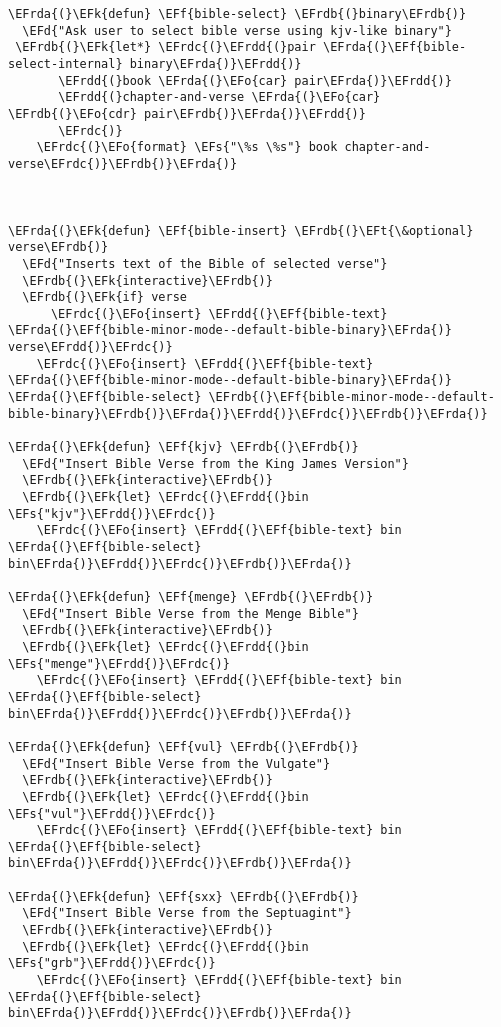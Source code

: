 \documentclass[a4wide,10pt]{article}
\newcommand{\EFs}[1]{\textcolor{EFs}{#1}} %
\newcommand{\EFd}[1]{\textcolor{EFd}{#1}} %
\newcommand{\EFk}[1]{\textcolor{EFk}{#1}} %
\newcommand{\EFf}[1]{\textcolor{EFf}{#1}} %
\newcommand{\EFt}[1]{\textcolor{EFt}{#1}} %
\newcommand{\EFo}[1]{\textcolor{EFo}{#1}} %
\newcommand{\EFrda}[1]{\textcolor{EFrda}{#1}} %
\newcommand{\EFrdb}[1]{\textcolor{EFrdb}{#1}} %
\newcommand{\EFrdc}[1]{\textcolor{EFrdc}{#1}} %
\newcommand{\EFrdd}[1]{\textcolor{EFrdd}{#1}} %
\begin{document}
\begin{Code}
\begin{Verbatim}
\EFrda{(}\EFk{defun} \EFf{bible-select} \EFrdb{(}binary\EFrdb{)}
  \EFd{"Ask user to select bible verse using kjv-like binary"}
 \EFrdb{(}\EFk{let*} \EFrdc{(}\EFrdd{(}pair \EFrda{(}\EFf{bible-select-internal} binary\EFrda{)}\EFrdd{)}
       \EFrdd{(}book \EFrda{(}\EFo{car} pair\EFrda{)}\EFrdd{)}
       \EFrdd{(}chapter-and-verse \EFrda{(}\EFo{car} \EFrdb{(}\EFo{cdr} pair\EFrdb{)}\EFrda{)}\EFrdd{)}
       \EFrdc{)}
    \EFrdc{(}\EFo{format} \EFs{"\%s \%s"} book chapter-and-verse\EFrdc{)}\EFrdb{)}\EFrda{)}



\EFrda{(}\EFk{defun} \EFf{bible-insert} \EFrdb{(}\EFt{\&optional} verse\EFrdb{)}
  \EFd{"Inserts text of the Bible of selected verse"}
  \EFrdb{(}\EFk{interactive}\EFrdb{)}
  \EFrdb{(}\EFk{if} verse
      \EFrdc{(}\EFo{insert} \EFrdd{(}\EFf{bible-text} \EFrda{(}\EFf{bible-minor-mode--default-bible-binary}\EFrda{)} verse\EFrdd{)}\EFrdc{)}
    \EFrdc{(}\EFo{insert} \EFrdd{(}\EFf{bible-text} \EFrda{(}\EFf{bible-minor-mode--default-bible-binary}\EFrda{)} \EFrda{(}\EFf{bible-select} \EFrdb{(}\EFf{bible-minor-mode--default-bible-binary}\EFrdb{)}\EFrda{)}\EFrdd{)}\EFrdc{)}\EFrdb{)}\EFrda{)}

\EFrda{(}\EFk{defun} \EFf{kjv} \EFrdb{(}\EFrdb{)}
  \EFd{"Insert Bible Verse from the King James Version"}
  \EFrdb{(}\EFk{interactive}\EFrdb{)}
  \EFrdb{(}\EFk{let} \EFrdc{(}\EFrdd{(}bin \EFs{"kjv"}\EFrdd{)}\EFrdc{)}
    \EFrdc{(}\EFo{insert} \EFrdd{(}\EFf{bible-text} bin \EFrda{(}\EFf{bible-select} bin\EFrda{)}\EFrdd{)}\EFrdc{)}\EFrdb{)}\EFrda{)}

\EFrda{(}\EFk{defun} \EFf{menge} \EFrdb{(}\EFrdb{)}
  \EFd{"Insert Bible Verse from the Menge Bible"}
  \EFrdb{(}\EFk{interactive}\EFrdb{)}
  \EFrdb{(}\EFk{let} \EFrdc{(}\EFrdd{(}bin \EFs{"menge"}\EFrdd{)}\EFrdc{)}
    \EFrdc{(}\EFo{insert} \EFrdd{(}\EFf{bible-text} bin \EFrda{(}\EFf{bible-select} bin\EFrda{)}\EFrdd{)}\EFrdc{)}\EFrdb{)}\EFrda{)}

\EFrda{(}\EFk{defun} \EFf{vul} \EFrdb{(}\EFrdb{)}
  \EFd{"Insert Bible Verse from the Vulgate"}
  \EFrdb{(}\EFk{interactive}\EFrdb{)}
  \EFrdb{(}\EFk{let} \EFrdc{(}\EFrdd{(}bin \EFs{"vul"}\EFrdd{)}\EFrdc{)}
    \EFrdc{(}\EFo{insert} \EFrdd{(}\EFf{bible-text} bin \EFrda{(}\EFf{bible-select} bin\EFrda{)}\EFrdd{)}\EFrdc{)}\EFrdb{)}\EFrda{)}

\EFrda{(}\EFk{defun} \EFf{sxx} \EFrdb{(}\EFrdb{)}
  \EFd{"Insert Bible Verse from the Septuagint"}
  \EFrdb{(}\EFk{interactive}\EFrdb{)}
  \EFrdb{(}\EFk{let} \EFrdc{(}\EFrdd{(}bin \EFs{"grb"}\EFrdd{)}\EFrdc{)}
    \EFrdc{(}\EFo{insert} \EFrdd{(}\EFf{bible-text} bin \EFrda{(}\EFf{bible-select} bin\EFrda{)}\EFrdd{)}\EFrdc{)}\EFrdb{)}\EFrda{)}


\end{Verbatim}
\end{Code}
\end{document}
